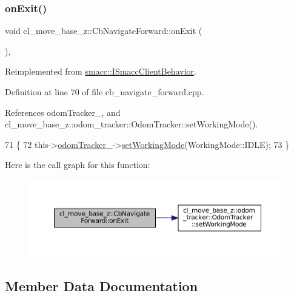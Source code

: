 \subsubsection{\texorpdfstring{on\+Exit()}{onExit()}}
{\footnotesize\ttfamily void cl\+\_\+move\+\_\+base\+\_\+z\+::\+Cb\+Navigate\+Forward\+::on\+Exit (\begin{DoxyParamCaption}{ }\end{DoxyParamCaption})\hspace{0.3cm}{\ttfamily [override]}, {\ttfamily [virtual]}}



Reimplemented from \hyperlink{classsmacc_1_1ISmaccClientBehavior_a36bf771905e3bf750909a15e4215a9b3}{smacc\+::\+I\+Smacc\+Client\+Behavior}.



Definition at line 70 of file cb\+\_\+navigate\+\_\+forward.\+cpp.



References odom\+Tracker\+\_\+, and cl\+\_\+move\+\_\+base\+\_\+z\+::odom\+\_\+tracker\+::\+Odom\+Tracker\+::set\+Working\+Mode().


\begin{DoxyCode}
71 \{
72     this->\hyperlink{classcl__move__base__z_1_1CbNavigateForward_a7583a4d669af48618bd45950db8e5292}{odomTracker\_}->\hyperlink{classcl__move__base__z_1_1odom__tracker_1_1OdomTracker_aeed01bdefd9a1cc709b0b3e4eed285ed}{setWorkingMode}(WorkingMode::IDLE);
73 \}
\end{DoxyCode}
Here is the call graph for this function\+:
\nopagebreak
\begin{figure}[H]
\begin{center}
\leavevmode
\includegraphics[width=350pt]{classcl__move__base__z_1_1CbNavigateForward_a2160484562ef5fb1c655fab7f990241e_cgraph}
\end{center}
\end{figure}


\subsection{Member Data Documentation}
\mbox{\label{classcl__move__base__z_1_1CbNavigateForward_a41bc9c319c64be6302f7365173ccd2c5}} 
